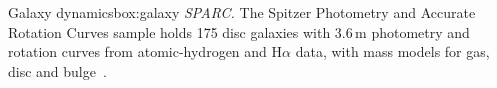 \begin{primer}{Galaxy dynamics}{box:galaxy}
\emph{SPARC.} The Spitzer Photometry and Accurate Rotation Curves sample holds 175 disc galaxies with 3.6\,\textmu m photometry and
rotation curves from atomic-hydrogen and H$\alpha$ data, with mass models for gas, disc and bulge~\cite{lelli2016}.
\end{primer}
